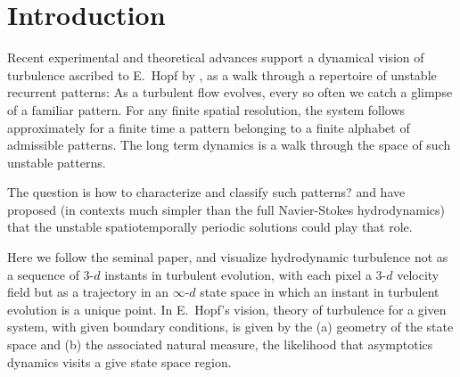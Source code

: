 %

\section{Introduction}


Recent experimental and theoretical advances  
support a dynamical vision
of turbulence ascribed to E.~Hopf by  \cite{EAS87}, as a walk through
a repertoire of unstable recurrent patterns:
As a turbulent flow evolves,
every so often we catch a glimpse of a familiar pattern.
For any finite  spatial resolution,
the system follows approximately for a finite time 
a pattern belonging to a 
{ finite alphabet}
of admissible patterns.
The long term dynamics is
a {  walk through the space of such unstable patterns}.

The question is how to characterize and classify such patterns?
\cite{MS66} and \cite{Christiansen:97} have proposed (in contexts
much simpler than the full Navier-Stokes hydrodynamics) 
that the unstable spatiotemporally periodic
solutions could play that role.

Here we follow the seminal
\cite{hopf48} paper, and  visualize
hydrodynamic turbulence not as  a sequence of 
3-$d$  instants in turbulent evolution, with
each pixel a 3-$d$ velocity field
but as a trajectory in an 
 $\infty$-$d$ state space in which an
instant in turbulent evolution is
a { unique} point. In E.~Hopf's vision, 
theory of turbulence for a given system, with given boundary conditions,
is given by the
(a) geometry of the state space and (b) the associated natural measure, 
\ie the likelihood that asymptotics dynamics visits a give state space region.


